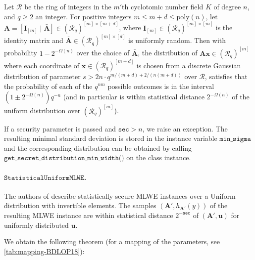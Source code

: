 \begin{theorem}
    Let $\mathcal{R}$ be the ring of integers in the $m'$th cyclotomic number field $K$ of degree $n$, and $q \geq 2$ an integer.
    For positive integers $m \leq m + d \leq \text{poly}(n)$, let $\mathbf{A} = [ \mathbf{I}_{[m]} \mid \bar{\mathbf{A}}] \in (\mathcal{R}_q)^{[m] \times [m+d]}$, where $\mathbf{I}_{[m]} \in (\mathcal{R}_q)^{[m] \times [m]}$ is the identity matrix and $\bar{\mathbf{A}} \in (\mathcal{R}_q)^{[m] \times [d]}$ is uniformly random.
    Then with probability $1 - 2^{-\Omega(n)}$ over the choice of $\bar{\mathbf{A}}$, the distribution of $\mathbf{A}\mathbf{x} \in (\mathcal{R}_q)^{[m]}$ where each coordinate of $\mathbf{x} \in (\mathcal{R}_q)^{[m+d]}$ is chosen from a discrete Gaussian distribution of parameter $s > 2n \cdot q^{m / (m+d) + 2/(n (m+d))}$ over $\mathcal{R}$, satisfies that the probability of each of the $q^{n m}$ possible outcomes is in the interval $(1 \pm 2^{-\Omega(n)}) q^{-n }$ (and in particular is within statistical distance $2^{-\Omega(n)}$ of the uniform distribution over $(\mathcal{R}_q)^{[m]}$). %
\end{theorem}

If a security parameter is passed and $\texttt{sec} > n$, we raise an exception.
The resulting minimal standard deviation is stored in the instance variable $\texttt{min\_sigma}$ and the corresponding distribution can be obtained by calling $\texttt{get\_secret\_distribution\_min\_width()}$ on the class instance.



\paragraph{$\texttt{StatisticalUniformMLWE}$.} The authors of \cite{BDLOP18} describe statistically secure MLWE instances over a Uniform distribution with invertible elements. The samples $(\mathbf{A}', h_{\mathbf{A}'}(y))$ of the resulting MLWE instance are within statistical distance $2^{-\texttt{sec}}$ of $(\mathbf{A}', \mathbf{u})$ for uniformly distributed $\mathbf{u}$. %

We obtain the following theorem (for a mapping of the parameters, see \cref{tab:mapping-BDLOP18}): %

